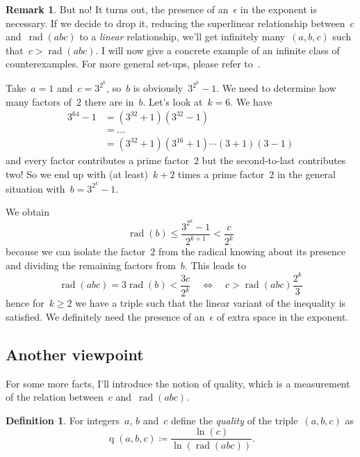 \documentclass[11pt, a4paper, openany, oneside, article]{memoir}
\theoremstyle{definition}
\newtheorem{definition}[theorem]{Definition}
\newtheorem{remark}[theorem]{Remark}
\DeclareMathOperator\rad{rad}
\DeclareMathOperator\quality{q}
\begin{document}
\begin{remark}
  But no! It turns out, the presence of an~$\epsilon$ in the exponent is necessary. If we decide to drop it, reducing the superlinear relationship between~$c$ and~$\rad(abc)$ to a \emph{linear} relationship, we'll get infinitely many~$(a,b,c)$ such that~$c>\rad(abc)$. I will now give a concrete example of an infinite class of counterexamples. For more general set-ups, please refer to~\cite{lower-bounds-abc-hits}.
  
  Take~$a=1$ and~$c=3^{2^k}$, so~$b$ is obviously~$3^{2^k}-1$. We need to determine how many factors of~$2$ there are in~$b$. Let's look at~$k=6$. We have
  \begin{equation}
    \begin{aligned}
      3^{64}-1&=(3^{32}+1)(3^{32}-1) \\
      &=\ldots \\
      &=(3^{32}+1)(3^{16}+1)\cdots(3+1)(3-1)
    \end{aligned}
  \end{equation}
  and every factor contributes a prime factor~$2$ but the second-to-last contributes two! So we end up with (at least)~$k+2$ times a prime factor~$2$ in the general situation with~$b=3^{2^k}-1$.
  
  We obtain
  \begin{equation}
    \rad(b)\leq\frac{3^{2^k}-1}{2^{k+1}}<\frac{c}{2^{k}}
  \end{equation}
  because we can isolate the factor~$2$ from the radical knowing about its presence and dividing the remaining factors from~$b$. This leads to
  \begin{equation}
    \rad(abc)=3\rad(b)<\frac{3c}{2^k}\quad\Leftrightarrow\quad c>\rad(abc)\frac{2^k}{3}
  \end{equation}
  hence for~$k\geq 2$ we have a triple such that the linear variant of the inequality is satisfied. We definitely need the presence of an~$\epsilon$ of extra space in the exponent.
\end{remark}

\subsection{Another viewpoint}

For some more facts, I'll introduce the notion of quality, which is a measurement of the relation between~$c$ and~$\rad(abc)$.

\begin{definition}
  For integers~$a$, $b$ and~$c$ define the \emph{quality} of the triple~$(a,b,c)$ as
  \begin{equation}
    \quality(a,b,c)\coloneqq\frac{\ln(c)}{\ln\left( \rad(abc) \right)}.
  \end{equation}
\end{definition}
\end{document}

